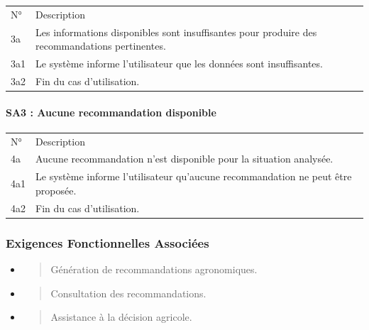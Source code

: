 \documentclass[
]{article}
\begin{document}
\begin{longtable}[]{@{}ll@{}}
\toprule
\endhead
N° & Description \\
3a & Les informations disponibles sont insuffisantes pour produire des
recommandations pertinentes. \\
3a1 & Le système informe l'utilisateur que les données sont
insuffisantes. \\
3a2 & Fin du cas d'utilisation. \\
\bottomrule
\end{longtable}

\hypertarget{sa3-aucune-recommandation-disponible}{%
\paragraph{SA3 : Aucune recommandation
disponible}\label{sa3-aucune-recommandation-disponible}}

\begin{longtable}[]{@{}ll@{}}
\toprule
\endhead
N° & Description \\
4a & Aucune recommandation n'est disponible pour la situation
analysée. \\
4a1 & Le système informe l'utilisateur qu'aucune recommandation ne peut
être proposée. \\
4a2 & Fin du cas d'utilisation. \\
\bottomrule
\end{longtable}

\hypertarget{exigences-fonctionnelles-associuxe9es-4}{%
\subsubsection{Exigences Fonctionnelles
Associées}\label{exigences-fonctionnelles-associuxe9es-4}}

\begin{itemize}
\item
  \begin{quote}
  Génération de recommandations agronomiques.
  \end{quote}
\item
  \begin{quote}
  Consultation des recommandations.
  \end{quote}
\item
  \begin{quote}
  Assistance à la décision agricole.
  \end{quote}
\end{itemize}
\end{document}
